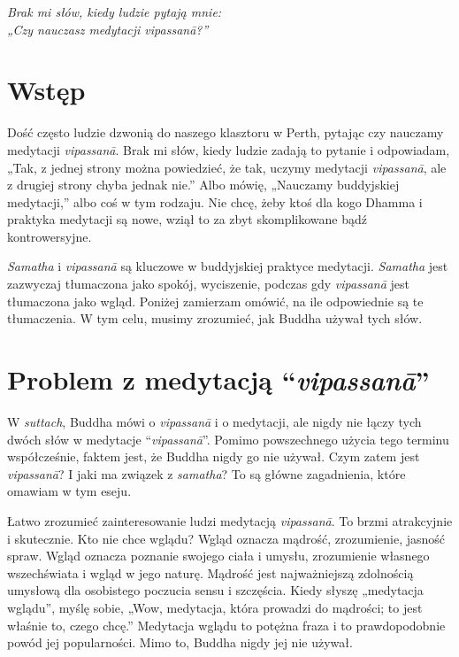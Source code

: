 \documentclass[12pt,openany]{book}
\begin{document}
 \newpage

\begin{center}\end{center}
\begin{center}

\vfill

\textit{\large Brak mi słów, kiedy ludzie pytają mnie: \\„Czy nauczasz medytacji vipassanā?”}

\vfill

\end{center}

\newpage
\mainmatter
\chapter*{Wstęp}

Dość często ludzie dzwonią do naszego klasztoru w Perth, pytając czy nauczamy medytacji \textit{vipassanā}. Brak mi słów, kiedy ludzie zadają to pytanie i odpowiadam, „Tak, z jednej strony można powiedzieć, że tak, uczymy medytacji \textit{vipassanā}, ale z drugiej strony chyba jednak nie.” Albo mówię, „Nauczamy buddyjskiej medytacji,” albo coś w tym rodzaju. Nie chcę, żeby ktoś dla kogo Dhamma i praktyka medytacji są nowe, wziął to za zbyt skomplikowane bądź kontrowersyjne.


\textit{Samatha} i \textit{vipassanā} są kluczowe w buddyjskiej praktyce medytacji. \textit{Samatha} jest zazwyczaj tłumaczona jako spokój, wyciszenie, podczas gdy \textit{vipassanā} jest tłumaczona jako wgląd. Poniżej zamierzam omówić, na ile odpowiednie są te tłumaczenia. W tym celu, musimy zrozumieć, jak Buddha używał tych słów.

\chapter*{Problem z medytacją “\textit{vipassanā}”}

\pagestyle{fancy}

W \textit{suttach}, Buddha mówi o \textit{vipassanā} i o medytacji, ale nigdy nie łączy tych dwóch słów w medytacje “\textit{vipassanā}”. Pomimo powszechnego użycia tego terminu współcześnie, faktem jest, że Buddha nigdy go nie używał. Czym zatem jest \textit{vipassanā}? I jaki ma związek z \textit{samatha}? To są główne zagadnienia, które omawiam w tym eseju.

Łatwo zrozumieć zainteresowanie ludzi medytacją \textit{vipassanā}. To brzmi atrakcyjnie i skutecznie. Kto nie chce wglądu? Wgląd oznacza mądrość, zrozumienie, jasność spraw. Wgląd oznacza poznanie swojego ciała i umysłu, zrozumienie własnego wszechświata i wgląd w jego naturę. Mądrość jest najważniejszą zdolnością umysłową dla osobistego poczucia sensu i szczęścia. Kiedy słyszę „medytacja wglądu”, myślę sobie, „Wow, medytacja, która prowadzi do mądrości; to jest właśnie to, czego chcę.” Medytacja wglądu to potężna fraza i to prawdopodobnie powód jej popularności. Mimo to, Buddha nigdy jej nie używał.
\end{document}
